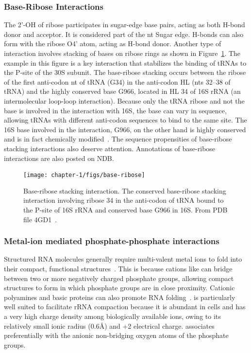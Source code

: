 \subsubsection{Base-Ribose Interactions}

The 2'-OH of ribose participates in sugar-edge base pairs, acting as both H-bond
donor and acceptor. It is considered part of the nt Sugar edge. H-bonds can also
form with the ribose O4' atom, acting as H-bond donor. Another type of
interaction involves stacking of bases on ribose rings as shown in
Figure~\ref{fig:base-ribose}. The example in this figure is a key interaction
that stabilizes the binding of tRNAs to the P-site of the 30S subunit. The
base-ribose stacking occurs between the ribose of the first anti-codon nt of
tRNA (G34) in the anti-codon HL (nts 32--38 of tRNA) and the highly conserved
base G966, located in HL 34 of 16S rRNA (an intermolecular loop-loop
interaction). Because only the tRNA ribose and not the base is involved in the
interaction with 16S, the base can vary in sequence, allowing tRNAs with
different anti-codon sequences to bind to the same site. The 16S base involved
in the interaction, G966, on the other hand is highly conserved and is in fact
chemically modified~\cite{Burakovsky2012}. The sequence propensities of
base-ribose stacking interactions also deserve attention. Annotations of
base-ribose interactions are also posted on NDB\@.

\begin{figure}
  \texttt{[image: chapter-1/figs/base-ribose]}
  \caption{Base-ribose stacking interaction. The conserved base-ribose stacking
    interaction involving ribose 34 in the anti-codon of tRNA bound to the
    P-site of 16S rRNA and conserved base G966 in 16S\@.  From PDB file
    4GD1~\cite{Dunkle2011a}.}
\label{fig:base-ribose}
\end{figure}

\subsubsection{Metal-ion mediated phosphate-phosphate interactions}

Structured RNA molecules generally require multi-valent metal ions to fold into
their compact, functional structures~\cite{Woodson2005, Bowman2012, Draper2005,
Draper2013, Auffinger2011, Tan2011}. This is because cations like  can
bridge between two or more negatively charged phosphate groups, allowing compact
structures to form in which phosphate groups are in close proximity. Cationic
polyamines and basic proteins can also promote RNA folding~\cite{Klein2004a,
Koculi2006}.  is particularly well suited to facilitate rRNA compaction
because it is abundant in cells and has a very high charge density among
biologically available ions, owing to its relatively small ionic radius (0.6\AA)
and +2 electrical charge.  associates preferentially with the anionic
non-bridging oxygen atoms of the phosphate groups. 


